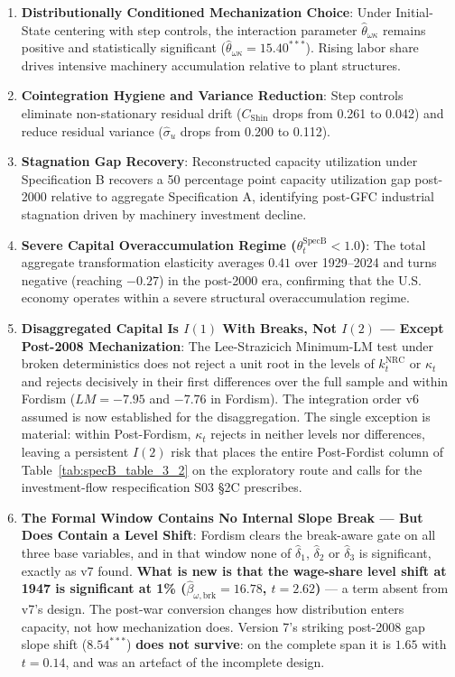 \documentclass[11pt,a4paper]{article}
\begin{document}
\begin{enumerate}
    \item \textbf{Distributionally Conditioned Mechanization Choice}: Under Initial-State centering with step controls, the interaction parameter $\hat{\theta}_{\omega \kappa}$ remains positive and statistically significant ($\hat{\theta}_{\omega \kappa} = 15.40^{***}$). Rising labor share drives intensive machinery accumulation relative to plant structures.
    \item \textbf{Cointegration Hygiene and Variance Reduction}: Step controls eliminate non-stationary residual drift ($C_{\text{Shin}}$ drops from 0.261 to 0.042) and reduce residual variance ($\hat{\sigma}_u$ drops from 0.200 to 0.112).
    \item \textbf{Stagnation Gap Recovery}: Reconstructed capacity utilization under Specification B recovers a 50 percentage point capacity utilization gap post-2000 relative to aggregate Specification A, identifying post-GFC industrial stagnation driven by machinery investment decline.
    \item \textbf{Severe Capital Overaccumulation Regime ($\theta_t^{\text{SpecB}} < 1.0$)}: The total aggregate transformation elasticity averages $0.41$ over 1929--2024 and turns negative (reaching $-0.27$) in the post-2000 era, confirming that the U.S. economy operates within a severe structural overaccumulation regime.
    \item \textbf{Disaggregated Capital Is $I(1)$ With Breaks, Not $I(2)$ --- Except Post-2008 Mechanization}: The Lee-Strazicich Minimum-LM test under broken deterministics does not reject a unit root in the levels of $k_t^{\text{NRC}}$ or $\kappa_t$ and rejects decisively in their first differences over the full sample and within Fordism ($LM = -7.95$ and $-7.76$ in Fordism). The integration order v6 assumed is now established for the disaggregation. The single exception is material: within Post-Fordism, $\kappa_t$ rejects in neither levels nor differences, leaving a persistent $I(2)$ risk that places the entire Post-Fordist column of Table~\ref{tab:specB_table_3_2} on the exploratory route and calls for the investment-flow respecification S03 \S2C prescribes.
    \item \textbf{The Formal Window Contains No Internal Slope Break --- But Does Contain a Level Shift}: Fordism clears the break-aware gate on all three base variables, and in that window none of $\hat{\delta}_1$, $\hat{\delta}_2$ or $\hat{\delta}_3$ is significant, exactly as v7 found. \textbf{What is new is that the wage-share level shift at 1947 is significant at 1\% ($\hat{\beta}_{\omega,\text{brk}} = 16.78$, $t = 2.62$)} --- a term absent from v7's design. The post-war conversion changes how distribution enters capacity, not how mechanization does. Version 7's striking post-2008 gap slope shift ($8.54^{***}$) \textbf{does not survive}: on the complete span it is $1.65$ with $t = 0.14$, and was an artefact of the incomplete design.

\end{enumerate}
\end{document}
